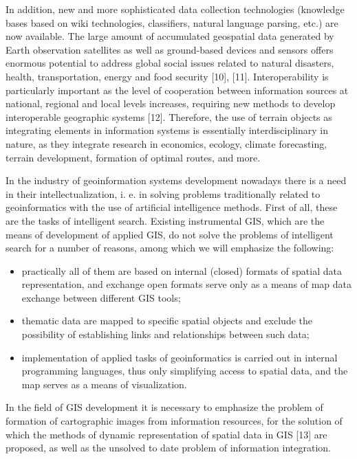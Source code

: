 \documentclass[10pt, letterpaper, twoside]{article}
\begin{document}
\begin{multicols}{2}
In addition, new and more sophisticated data collection
technologies (knowledge bases based on wiki technologies, classifiers, natural language parsing, etc.) are now
available. The large amount of accumulated geospatial
data generated by Earth observation satellites as well
as ground-based devices and sensors offers enormous
potential to address global social issues related to natural
disasters, health, transportation, energy and food security
[10], [11]. Interoperability is particularly important as
the level of cooperation between information sources
at national, regional and local levels increases, requiring new methods to develop interoperable geographic
systems [12]. Therefore, the use of terrain objects as
integrating elements in information systems is essentially
interdisciplinary in nature, as they integrate research in
economics, ecology, climate forecasting, terrain development, formation of optimal routes, and more.

In the industry of geoinformation systems development
nowadays there is a need in their intellectualization, i. e.
in solving problems traditionally related to geoinformatics with the use of artificial intelligence methods. First
of all, these are the tasks of intelligent search. Existing
instrumental GIS, which are the means of development
of applied GIS, do not solve the problems of intelligent
search for a number of reasons, among which we will
emphasize the following:
\begin{itemize}[noitemsep]
    \item  practically all of them are based on internal (closed) formats of spatial data representation, and exchange open formats serve only as a means of map data exchange between different GIS tools;
    \item  thematic data are mapped to specific spatial objects
     and exclude the possibility of establishing links and 
    relationships between such data;
    \item implementation of applied tasks of geoinformatics is carried out in internal programming languages, thus only simplifying access to spatial data, and the map serves as a means of visualization.
\end{itemize}

In the field of GIS development it is necessary to
emphasize the problem of formation of cartographic
images from information resources, for the solution of
which the methods of dynamic representation of spatial
data in GIS [13] are proposed, as well as the unsolved
to date problem of information integration.


\end{multicols}
\end{document}
